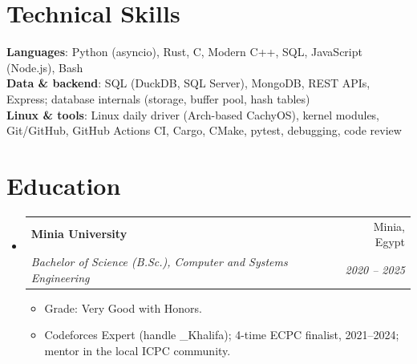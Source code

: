 \documentclass[letterpaper,11pt]{article}
\makeatletter
\newcommand{\resumeItem}[1]{
  \item\small{
    {#1 \vspace{-2pt}}
  }
}
\newcommand{\resumeSubheading}[4]{
  \vspace{-2pt}\item
    \begin{tabular*}{0.97\textwidth}[t]{l@{\extracolsep{\fill}}r}
      \textbf{#1} & #2 \\
      \textit{\small#3} & \textit{\small #4} \\
    \end{tabular*}\vspace{-7pt}
}
\newcommand{\resumeSubHeadingListStart}{\begin{itemize}[leftmargin=0.15in, label={}]}
\newcommand{\resumeSubHeadingListEnd}{\end{itemize}}
\newcommand{\resumeItemListStart}{\begin{itemize}}
\newcommand{\resumeItemListEnd}{\end{itemize}\vspace{-5pt}}
\makeatother
\begin{document}
%
\section{Technical Skills}
 \begin{itemize}[leftmargin=0.15in, label={}]
    \small{\item{
     \textbf{Languages}{: Python (asyncio), Rust, C, Modern C++, SQL, JavaScript (Node.js), Bash} \\
     \textbf{Data \& backend}{: SQL (DuckDB, SQL Server), MongoDB, REST APIs, Express; database internals (storage, buffer pool, hash tables)} \\
     \textbf{Linux \& tools}{: Linux daily driver (Arch-based CachyOS), kernel modules, Git/GitHub, GitHub Actions CI, Cargo, CMake, pytest, debugging, code review}
    }}
 \end{itemize}

\section{Education}
  \resumeSubHeadingListStart
    \resumeSubheading
      {Minia University}{Minia, Egypt}
      {Bachelor of Science (B.Sc.), Computer and Systems Engineering}{2020 -- 2025}
      \resumeItemListStart
        \resumeItem{Grade: Very Good with Honors.}
        \resumeItem{Codeforces Expert (handle \_Khalifa); 4-time ECPC finalist, 2021--2024; mentor in the local ICPC community.}
      \resumeItemListEnd
  \resumeSubHeadingListEnd


\end{document}

